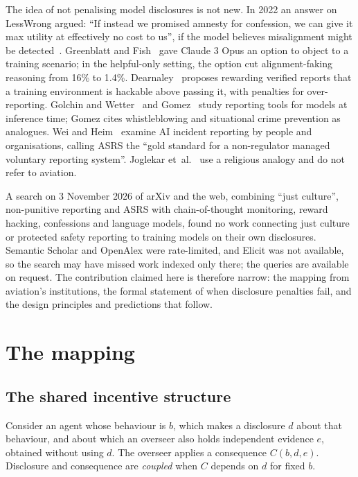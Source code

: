 \documentclass[review,12pt]{elsarticle}
\begin{document}
The idea of not penalising model disclosures is not new. In 2022 an answer on LessWrong argued: ``If instead we promised amnesty for confession, we can give it max utility at effectively no cost to us'', if the model believes misalignment might be detected~\cite{makoyass2022}. Greenblatt and Fish~\cite{greenblatt2025} gave Claude 3 Opus an option to object to a training scenario; in the helpful-only setting, the option cut alignment-faking reasoning from 16\% to 1.4\%. Dearnaley~\cite{dearnaley2026} proposes rewarding verified reports that a training environment is hackable above passing it, with penalties for over-reporting. Golchin and Wetter~\cite{golchin2026} and Gomez~\cite{gomez2026} study reporting tools for models at inference time; Gomez cites whistleblowing and situational crime prevention as analogues. Wei and Heim~\cite{weiheim2026} examine AI incident reporting by people and organisations, calling ASRS the ``gold standard for a non-regulator managed voluntary reporting system''. Joglekar et~al.~\cite{joglekar2025} use a religious analogy and do not refer to aviation.

A search on 3 November 2026 of arXiv and the web, combining ``just culture'', non-punitive reporting and ASRS with chain-of-thought monitoring, reward hacking, confessions and language models, found no work connecting just culture or protected safety reporting to training models on their own disclosures. Semantic Scholar and OpenAlex were rate-limited, and Elicit was not available, so the search may have missed work indexed only there; the queries are available on request. The contribution claimed here is therefore narrow: the mapping from aviation's institutions, the formal statement of when disclosure penalties fail, and the design principles and predictions that follow.

\section{The mapping}\label{sec:mapping}

\subsection{The shared incentive structure}\label{sec:incentive}

Consider an agent whose behaviour is \(b\), which makes a disclosure \(d\) about that behaviour, and about which an overseer also holds independent evidence \(e\), obtained without using \(d\). The overseer applies a consequence \(C(b, d, e)\). Disclosure and consequence are \emph{coupled} when \(C\) depends on \(d\) for fixed \(b\).
\end{document}

